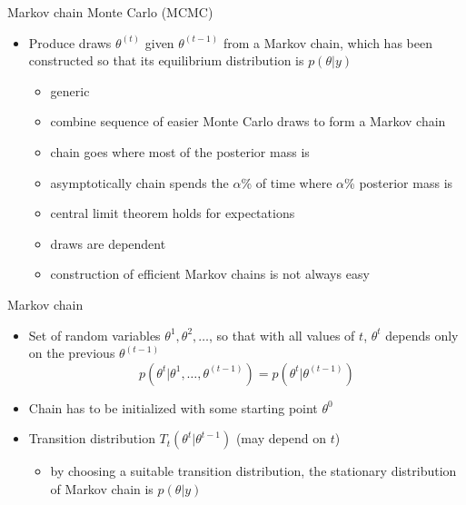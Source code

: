 \documentclass[finnish,english,t]{beamer}
\begin{document}
  
\begin{frame}{Markov chain Monte Carlo (MCMC)}

  \begin{itemize}
  \item Produce draws $\theta^{(t)}$ given $\theta^{(t-1)}$ from a
    Markov chain, which has been constructed so that its equilibrium
    distribution is $p(\theta|y)$
    \begin{itemize}
    \item<2->[+] generic
    \item<2->[+] combine sequence of easier Monte Carlo draws to form a Markov chain
    \item<3->[+] chain goes where most of the posterior mass is
    \item<3->[+] asymptotically chain spends the $\alpha$\% of time where
      $\alpha$\% posterior mass is
    \item<4->[+] central limit theorem holds for expectations 
    \item<5->[-] draws are dependent
    \item<5->[-] construction of efficient Markov chains is not always
      easy
    \end{itemize}
\end{itemize}

\end{frame}

\begin{frame}{Markov chain}

  \begin{itemize}
  \item Set of random variables $\theta^1,\theta^2,\ldots$, so that
    with all values of $t$, $\theta^t$ depends only on the previous $\theta^{(t-1)}$
    \begin{equation*}
      p(\theta^t|\theta^1,\ldots,\theta^{(t-1)})=p(\theta^t|\theta^{(t-1)})
    \end{equation*}
  \item<2-> Chain has to be initialized with some starting point $\theta^0$
  \item<3-> Transition distribution $T_t(\theta^t|\theta^{t-1})$ (may
    depend on $t$)
    \begin{itemize}
    \item by choosing a suitable transition distribution, the
      stationary distribution of Markov chain is $p(\theta|y)$
    \end{itemize}
  \end{itemize}

\end{frame}
\end{document}
